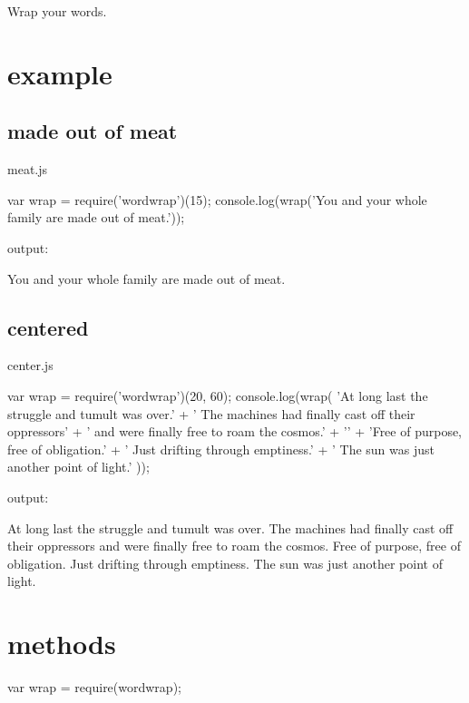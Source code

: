 Wrap your words.

\section*{example }

\subsection*{made out of meat }

meat.\+js \begin{DoxyVerb}var wrap = require('wordwrap')(15);
console.log(wrap('You and your whole family are made out of meat.'));
\end{DoxyVerb}


output\+: \begin{DoxyVerb}You and your
whole family
are made out
of meat.
\end{DoxyVerb}


\subsection*{centered }

center.\+js \begin{DoxyVerb}var wrap = require('wordwrap')(20, 60);
console.log(wrap(
    'At long last the struggle and tumult was over.'
    + ' The machines had finally cast off their oppressors'
    + ' and were finally free to roam the cosmos.'
    + '\n'
    + 'Free of purpose, free of obligation.'
    + ' Just drifting through emptiness.'
    + ' The sun was just another point of light.'
));
\end{DoxyVerb}


output\+: \begin{DoxyVerb}                    At long last the struggle and tumult
                    was over. The machines had finally cast
                    off their oppressors and were finally
                    free to roam the cosmos.
                    Free of purpose, free of obligation.
                    Just drifting through emptiness. The
                    sun was just another point of light.
\end{DoxyVerb}


\section*{methods }

var wrap = require(\textquotesingle{}wordwrap\textquotesingle{});

